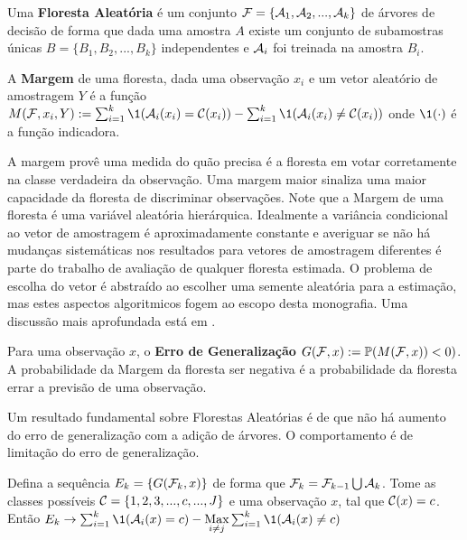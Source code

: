  \begin{defi}
 Uma \textbf{Floresta Aleatória} é um conjunto $\mathcal{F} = \{\mathcal{A}_1, \mathcal{A}_2,...,\mathcal{A}_k\}$ de árvores de decisão de forma que dada uma amostra $A$ existe um conjunto de subamostras únicas $B = \{ B_1, B_2, ..., B_k\}$ independentes e $\mathcal{A}_i$ foi treinada na amostra $B_i$.
  \end{defi}
  
  \begin{defi}
  A \textbf{Margem} de uma floresta, dada uma observação $x_i$ e um vetor aleatório de amostragem $Y$ é a função $M(\F, x_i, Y) := \sum_{i=1}^k \1 ( \A_i (x_i) = \C(x_i) ) - \sum_{i=1}^k \1  ( \A_i (x_i) \neq \C(x_i) )  $ onde $\1(\cdot)$ é a função indicadora.
  \end{defi}
  
  A margem provê uma medida do quão precisa é a floresta em votar corretamente na classe verdadeira da observação. Uma margem maior sinaliza uma maior capacidade da floresta de discriminar observações. Note que a Margem de uma floresta é uma variável aleatória hierárquica. Idealmente a variância condicional ao vetor de amostragem é aproximadamente constante e averiguar se não há mudanças sistemáticas nos resultados para vetores de amostragem diferentes é parte do trabalho de avaliação de qualquer floresta estimada. O problema de escolha do vetor é abstraído ao escolher uma semente aleatória para a estimação, mas estes aspectos algoritmicos fogem ao escopo desta monografia. Uma discussão mais aprofundada está em . 
  
  \begin{defi}
 Para uma observação $x$, o \textbf{Erro de Generalização} $G(\mathcal{F}, x) := \mathbb{P} (M(\mathcal{F}, x)) < 0)$. A probabilidade da Margem da floresta ser negativa é a probabilidade da floresta errar a previsão de uma observação.
  \end{defi}
  
 Um resultado fundamental sobre Florestas Aleatórias é de que não há aumento do erro de generalização com a adição de árvores. O comportamento é de limitação do erro de generalização.
 
 \begin{teo}
 Defina a sequência $E_k = \{ G(\mathcal{F}_k, x) \}$ de forma que $\mathcal{F}_k = \mathcal{F}_{k-1} \bigcup \mathcal{A}_k $. Tome as classes possíveis $\mathcal{C} = \{1,2,3,...,c,...,J \}$ e uma observação $x$, tal que $\mathcal{C}(x) = c$. Então $E_k \to \sum_{i=1}^k \1 ( \A_i (x) = c ) - \underset{i \neq j}{\text{Max}} \sum_{i=1}^k \1  ( \A_i (x) \neq c) $
 
 \end{teo}
 
